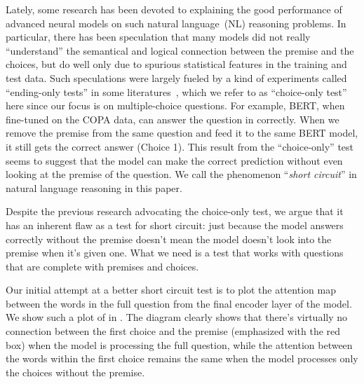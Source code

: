 Lately, some research has been devoted to explaining the good performance
of advanced neural models on such natural language~(NL) reasoning problems.
In particular, there has been speculation that many models did not
really ``understand'' the semantical and logical connection between
the premise and the choices, 
but do well only due to spurious statistical features in the 
training and test data.
Such speculations were largely fueled by a kind of
experiments called ``ending-only tests'' in some literatures~\cite{endingonly1,endingonly2}, 
which we refer to as ``choice-only test'' here since our focus is 
on multiple-choice questions.
For example, BERT, when fine-tuned on the COPA data, can answer
the question in  correctly. When we remove the premise from 
the same question and feed it to the same BERT model, it still
gets the correct answer (Choice 1). This result from the ``choice-only'' 
test seems to suggest that the model can make the correct prediction
without even looking at the premise of the question. 
We call the phenomenon ``\textit{short circuit}'' in natural language 
reasoning in this paper.

Despite the previous research advocating the choice-only test,
we argue that it has an inherent flaw as a test for
short circuit: just because the model answers correctly without
the premise doesn't mean the model doesn't look into the premise
when it's given one. What we need is a test that works with questions
that are complete with premises and choices.


Our initial attempt at a better short circuit test
is to plot the attention map between the words in the full question 
from the final encoder layer of the model. We show
such a plot of  in .
The diagram clearly shows that there's virtually no connection
between the first choice and the premise (emphasized with the red box) when the model is processing
the full question, while the attention between the words within the
first choice remains the same when the model processes only the choices
without the premise.

